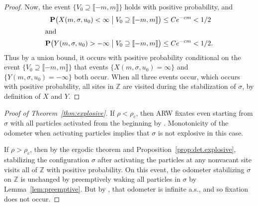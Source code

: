 \documentclass[ECP]{ejpecp} %
\begin{document}
\begin{proof}
Now, the event $\{V_{0} \supseteq \mathopen{\llbracket }-m,m \mathclose{\rrbracket }\}$ holds with positive probability,
and
%
\begin{align*}
\mathbf{P}\bigl(X(m, \sigma , u_{0})<\infty \;\big \vert \;V_{0}
\supseteq \mathopen{\llbracket }-m,m \mathclose{\rrbracket }\bigr)&\leq Ce^{-cm}<1/2
\\
\intertext{and} \mathbf{P}\bigl(Y(m, \sigma , u_{0})>-\infty \;
\big \vert \;V_{0} \supseteq \mathopen{\llbracket }-m,m \mathclose{\rrbracket }\bigr)&\leq Ce^{-cm}<1/2.
\end{align*}
%
Thus by a union bound, it occurs with positive probability conditional
on the event $\{V_{0} \supseteq \mathopen{\llbracket }-m,m \mathclose{\rrbracket }\}$ that events
$\{X(m, \sigma , u_{0})=\infty \}$ and
$\{Y(m, \sigma , u_{0})=-\infty \}$ both occur. When all three events occur,
which occurs with positive probability, all sites in $\mathbb{Z}$ are visited
during the stabilization of $\sigma $, by definition of $X$ and $Y$.
\end{proof}

\begin{proof}[Proof of Theorem~\ref{thm:explosive}]
If $\rho <\rho _{c}$, then ARW fixates even starting from $\sigma $ with
all particles activated from the beginning by
\cite[Theorem~1]{RollaSidoraviciusZindy19}. Monotonicity of the odometer
when activating particles \cite[Lemma~2.5]{rolla2020activated} implies
that $\sigma $ is not explosive in this case.

If $\rho >\rho _{c}$, then by the ergodic theorem and Proposition~\ref{prop:det.explosive},
stabilizing the configuration $\sigma $ after activating the particles
at any nonvacant site visits all of $\mathbb{Z}$ with positive probability.
On this event, the odometer stabilizing $\sigma$ on $\mathbb{Z}$ is unchanged
by preemptively waking all particles in $\sigma$ by Lemma~\ref{lem:preemptive}.
But by \cite[Theorem~1]{RollaSidoraviciusZindy19}, that odometer is infinite
a.s., and so fixation does not occur.
\end{proof}

\end{document}
